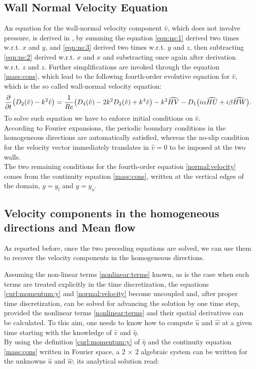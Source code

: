 \subsection{Wall Normal Velocity Equation}
An equation for the wall-normal velocity component $\hat{v}$, which does not involve pressure, is derived in \cite{kim_moin_moser}, by summing the equation \eqref{eqn:ns:1} derived two times w.r.t. $x$ and $y$, and \eqref{eqn:ns:3} derived two times w.r.t. $y$ and $z$, then subtracting \eqref{eqn:ns:2} derived w.r.t. $x$ and $x$ and substracting once again after derivation w.r.t. $z$ and $z$.
Further simplifications are invoked through the equation \eqref{mass:cons}, which lead to the following fourth-order evolutive equation for $\hat{v}$, which is the so called wall-normal velocity equation:
\begin{equation}
\frac{\partial}{\partial t} \big( D_{2}(\hat{v}) - k^{2} \hat{v} \big) = \frac{1}{Re} \big( D_{4}(\hat{v}) - 2k^{2} D_{2}(\hat{v}) + k^{4} \hat{v} \big)  \\
	-k^{2} \widehat{HV} - D_{1} \big(  i \alpha \widehat{HU} + i \beta \widehat{HW} \big).
\label{normal:velocity}
\end{equation}
To solve such equation we have to enforce initial conditions on $\hat{v}$.\\
According to Fourier expansions, the periodic boundary conditions in the homogeneous directions are automatically satisfied, whereas the no-slip condition for the velocity vector immediately translates in $\hat{v} = 0$ to be imposed at the two walls.\\
The two remaining conditions for the fourth-order equation \eqref{normal:velocity} comes from the continuity equation \eqref{mass:cons}, written at the vertical edges of the domain, $y= y_{l}$ and $y=y_{u}$.


\subsection{Velocity components in the homogeneous directions and Mean flow}
As reported before, once the two preceding equations are solved, we can use them to recover the velocity components in the homogeneous directions.\par
Assuming the non-linear terms \eqref{nonlinear:terms} known, as is the case when such terms are treated explicitly in the time discretization, the equations \eqref{curl:momentum:y} and \eqref{normal:velocity} become uncoupled and, after proper time discretization, can be solved for advancing the solution by one time step, provided the nonlinear terms \eqref{nonlinear:terms} and their spatial derivatives can be calculated.
To this aim, one needs to know how to compute $\hat{u}$ and $\hat{w}$ at a given time starting with the knowledge of $\hat{v}$ and $\hat{\eta}$. \\
By using the definition \eqref{curl:momentum:y} of $\hat{\eta}$ and the continuity equation \eqref{mass:cons} written in Fourier space, a 2 $\times$ 2 algebraic system can be written for the unknowns $\hat{u}$ and $\hat{w}$; its analytical solution read:

